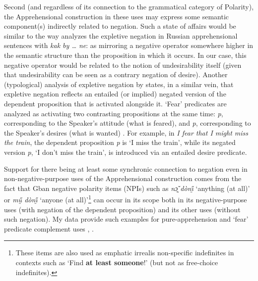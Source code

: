 \documentclass[output=paper,colorlinks,citecolor=brown
]{langscibook}
\begin{document}
Second (and regardless of its connection to the grammatical category of Polarity), the Apprehensional construction in these uses may express some semantic component(s) indirectly related to negation. Such a state of affairs would be similar to the way \citet{abels2005} analyzes the expletive negation in Russian apprehensional sentences with \textit{kak by {\dots} ne}: as mirroring a negative operator somewhere higher in the semantic structure than the proposition in which it occurs. In our case, this negative operator would be related to the notion of undesirability itself (given that undesirability can be seen as a contrary negation of desire). Another (typological) analysis of expletive negation by \citet{jinkoenig2020} states, in a similar vein, that expletive negation reflects an entailed (or implied) negated version of the dependent proposition that is activated alongside it. `Fear' predicates are analyzed as activating two contrasting propositions at the same time: \textit{p}, corresponding to the Speaker's attitude (what is feared), and \neg \textit{p}, corresponding to the Speaker's desires (what is wanted) \citep[22]{jinkoenig2020}. For example, in \textit{I fear that I might miss the train}, the dependent proposition \textit{p} is `I miss the train', while its negated version \neg \textit{p}, `I don't miss the train', is introduced via an entailed desire predicate.

Support for there being at least some synchronic connection to negation even in non-negative-purpose uses of the Apprehensional construction comes from the fact that Gban negative polarity items (NPIs) such as \textit{nɔ̰̌ dònı̰̋} `anything (at all)' or \textit{mṵ̋ dònı̰̋} `anyone (at all)'\footnote{These items are also used as emphatic irrealis non-specific indefinites in contexts such as `Find \textbf{at least someone}!' (but not as free-choice indefinites).} can occur in its scope both in its negative-purpose uses  (with negation of the dependent proposition) and its other uses (without such negation). My data provide such examples for pure-apprehension  and `fear' predicate complement uses , .

\z
\end{document}
